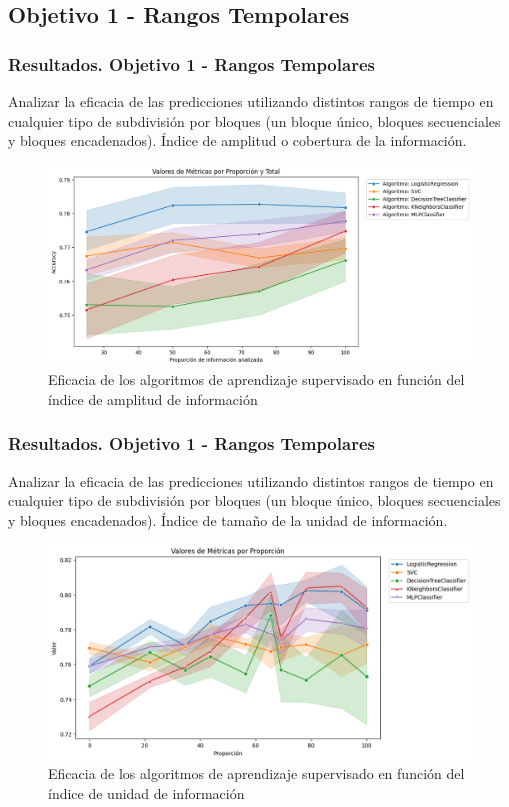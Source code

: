 \documentclass{beamer}
\begin{document}
\subsection{ Objetivo 1 - Rangos Tempolares}
\begin{frame}
	\frametitle{Resultados. Objetivo 1 - Rangos Tempolares}
	\begin{block}{Analizar la eficacia de las predicciones utilizando distintos rangos de tiempo en cualquier tipo de subdivisión por bloques (un bloque único, bloques secuenciales y bloques encadenados).}
		Índice de amplitud o cobertura de la información.
	\end{block}
	
\begin{figure}[H]
	\centering
		\includegraphics[width=0.6\linewidth]{figs/cap7/figura_14}
	\caption{Eficacia de los algoritmos de aprendizaje supervisado en función del índice de amplitud de información}
	
	\label{fig:figura205}
\end{figure}
	
\end{frame}


\begin{frame}
	\frametitle{Resultados. Objetivo 1 - Rangos Tempolares}
	\begin{block}{Analizar la eficacia de las predicciones utilizando distintos rangos de tiempo en cualquier tipo de subdivisión por bloques (un bloque único, bloques secuenciales y bloques encadenados).}
		Índice de tamaño de la unidad de información.
	\end{block}
	
\begin{figure}[H]
	\centering
	\includegraphics[width=0.6\linewidth]{figs/cap7/figura_12}
	\caption{Eficacia de los algoritmos de aprendizaje supervisado en función del índice de unidad de información}
	
	\label{fig:figura206}
\end{figure}

	
\end{frame}
\end{document}

